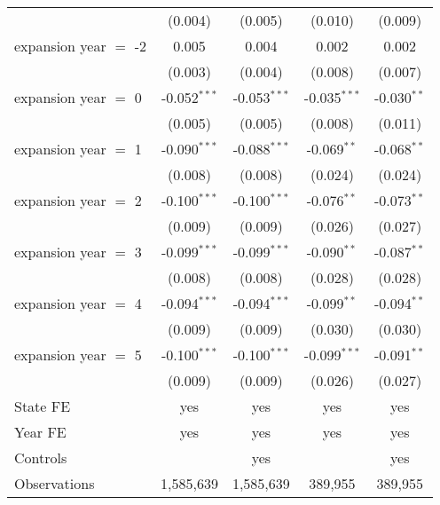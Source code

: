 \documentclass[
]{article}
\let\origtable\table
\let\endorigtable\endtable
\renewenvironment{table}[1][ht]{
      \expandafter\origtable\expandafter[H]
    }{
      \endorigtable
    }
\begin{document}
\begin{table}[htbp]
\begin{tabular}{lcccc}
                            & (0.004)        & (0.005)                & (0.010)        & (0.009)\\   
      expansion year $=$ -2 & 0.005          & 0.004                  & 0.002          & 0.002\\   
                            & (0.003)        & (0.004)                & (0.008)        & (0.007)\\   
      expansion year $=$ 0  & -0.052$^{***}$ & -0.053$^{***}$         & -0.035$^{***}$ & -0.030$^{**}$\\   
                            & (0.005)        & (0.005)                & (0.008)        & (0.011)\\   
      expansion year $=$ 1  & -0.090$^{***}$ & -0.088$^{***}$         & -0.069$^{**}$  & -0.068$^{**}$\\   
                            & (0.008)        & (0.008)                & (0.024)        & (0.024)\\   
      expansion year $=$ 2  & -0.100$^{***}$ & -0.100$^{***}$         & -0.076$^{**}$  & -0.073$^{**}$\\   
                            & (0.009)        & (0.009)                & (0.026)        & (0.027)\\   
      expansion year $=$ 3  & -0.099$^{***}$ & -0.099$^{***}$         & -0.090$^{**}$  & -0.087$^{**}$\\   
                            & (0.008)        & (0.008)                & (0.028)        & (0.028)\\   
      expansion year $=$ 4  & -0.094$^{***}$ & -0.094$^{***}$         & -0.099$^{**}$  & -0.094$^{**}$\\   
                            & (0.009)        & (0.009)                & (0.030)        & (0.030)\\   
      expansion year $=$ 5  & -0.100$^{***}$ & -0.100$^{***}$         & -0.099$^{***}$ & -0.091$^{**}$\\   
                            & (0.009)        & (0.009)                & (0.026)        & (0.027)\\   
      State FE              & yes            & yes                    & yes            & yes\\  
      Year FE               & yes            & yes                    & yes            & yes\\  
      Controls              &                & yes                    &                & yes\\  
      Observations          & 1,585,639      & 1,585,639              & 389,955        & 389,955\\  

\end{tabular}
\end{table}
\end{document}
